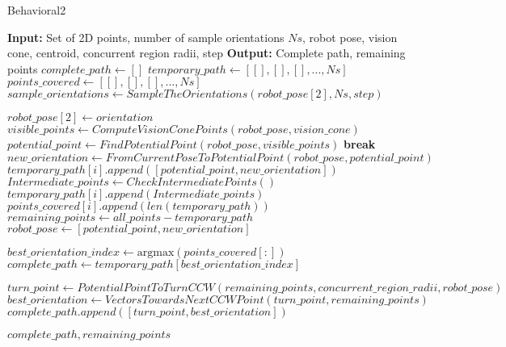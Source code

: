 \begin{algorithm}[H]
    \caption{Behavioral2}
    \begin{algorithmic}[1]
        \Statex \textbf{Input:} Set of 2D points, number of sample orientations $Ns$, robot pose, vision cone, centroid, concurrent region radii, step
        \Statex \textbf{Output:} Complete path, remaining points
        \newline
        \State $complete\_path \gets []$
        \State $temporary\_path \gets [[], [], [], ..., Ns]$
        \State $points\_covered \gets [[], [], [], ..., Ns]$
        \State $sample\_orientations \gets SampleTheOrientations(robot\_pose[2], Ns, step)$
        
            \State $robot\_pose[2] \gets orientation$
                \State $visible\_points \gets ComputeVisionConePoints(robot\_pose, vision\_cone)$
                \State $potential\_point \gets FindPotentialPoint(robot\_pose, visible\_points)$
                    \State \textbf{break}
                \EndIf
                \State $new\_orientation \gets FromCurrentPoseToPotentialPoint(robot\_pose, potential\_point)$
                \State $temporary\_path[i].append([potential\_point, new\_orientation])$
                \State $Intermediate\_points \gets CheckIntermediatePoints()$
                \State $temporary\_path[i].append(Intermediate\_points)$
                \State $points\_covered[i].append(len(temporary\_path))$
                \State $remaining\_points \gets all\_points - temporary\_path$
                \State $robot\_pose \gets [potential\_point, new\_orientation]$
            \EndWhile
        \EndFor
        
        \State $best\_orientation\_index \gets \text{argmax}(points\_covered[:])$
        \State $complete\_path \gets temporary\_path[best\_orientation\_index]$
        
        \State $turn\_point \gets PotentialPointToTurnCCW(remaining\_points, concurrent\_region\_radii, robot\_pose)$
        \State $best\_orientation \gets VectorsTowardsNextCCWPoint(turn\_point, remaining\_points)$
        \State $complete\_path.append([turn\_point, best\_orientation])$
        
        \State \Return $complete\_path, remaining\_points$
    \end{algorithmic}
\end{algorithm}


